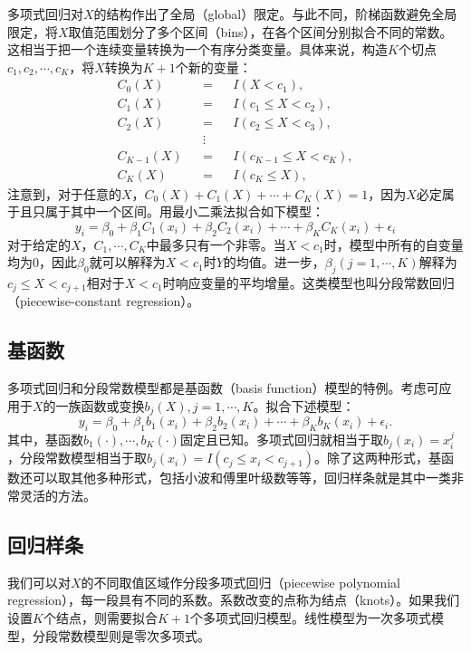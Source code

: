 \documentclass[hyperref,]{ctexart}
\begin{document}
多项式回归对\(X\)的结构作出了全局（global）限定。与此不同，阶梯函数避免全局限定，将\(X\)取值范围划分了多个区间（bins），在各个区间分别拟合不同的常数。这相当于把一个连续变量转换为一个有序分类变量。具体来说，构造\(K\)个切点\(c_1,c_2,\cdots,c_K\)，将\(X\)转换为\(K+1\)个新的变量：
\[
\begin{eqnarray}
C_0(X) && = && I(X<c_1), \\
C_1(X) && = && I(c_1\leq X<c_2), \\
C_2(X) && = && I(c_2\leq X<c_3), \\
       && \vdots &&      \\
C_{K-1}(X) && = && I(c_{K-1}\leq X < c_K), \\
C_K(X) && = && I(c_K\leq X),
\end{eqnarray}
\]
注意到，对于任意的\(X\)，\(C_0(X)+C_1(X)+\cdots+C_K(X)=1\)，因为\(X\)必定属于且只属于其中一个区间。用最小二乘法拟合如下模型：
\[y_i=\beta_0+\beta_1C_1(x_i)+\beta_2C_2(x_i)+\cdots+\beta_KC_K(x_i)+\epsilon_i\]
对于给定的\(X\)，\(C_1,\cdots,C_K\)中最多只有一个非零。当\(X<c_1\)时，模型中所有的自变量均为0，因此\(\beta_0\)就可以解释为\(X<c_1\)时\(Y\)的均值。进一步，\(\beta_j(j=1,\cdots,K)\)解释为\(c_j\leq X< c_{j+1}\)相对于\(X<c_1\)时响应变量的平均增量。这类模型也叫分段常数回归（piecewise-constant
regression）。

\subsection{基函数}

多项式回归和分段常数模型都是基函数（basis
function）模型的特例。考虑可应用于\(X\)的一族函数或变换\(b_j(X),j=1,\cdots,K\)。拟合下述模型：
\[y_i=\beta_0+\beta_1b_1(x_i)+\beta_2b_2(x_i)+\cdots+\beta_Kb_K(x_i)+\epsilon_i.\]
其中，基函数\(b_1(\cdot),\cdots,b_K(\cdot)\)固定且已知。多项式回归就相当于取\(b_j(x_i)=x_i^j\)，分段常数模型相当于取\(b_j(x_i)=I(c_j\leq x_i<c_{j+1})\)。除了这两种形式，基函数还可以取其他多种形式，包括小波和傅里叶级数等等，回归样条就是其中一类非常灵活的方法。

\subsection{回归样条}

我们可以对\(X\)的不同取值区域作分段多项式回归（piecewise polynomial
regression），每一段具有不同的系数。系数改变的点称为结点（knots）。如果我们设置\(K\)个结点，则需要拟合\(K+1\)个多项式回归模型。线性模型为一次多项式模型，分段常数模型则是零次多项式。
\end{document}
